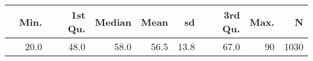 \begin{table}[ht]
\centering
\begin{tabular}{rrrrrrrrr}
  \hline
 & Min. & 1st Qu. & Median & Mean & sd & 3rd Qu. & Max. & N \\ 
  \hline
 & 20.0 & 48.0 & 58.0 & 56.5 & 13.8 & 67.0 & 90 & 1030 \\ 
   \hline
\end{tabular}
\end{table}
